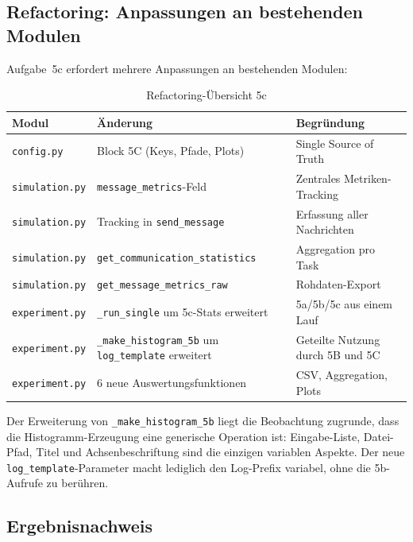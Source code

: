 
\subsection{Refactoring: Anpassungen an bestehenden Modulen}

Aufgabe~5c erfordert mehrere Anpassungen an bestehenden Modulen:

\begin{table}[H]
    \centering
    \scriptsize
    \begin{tabular}{l l l}
        \toprule
        \textbf{Modul} & \textbf{Änderung} & \textbf{Begründung} \\
        \midrule
        \texttt{config.py} & Block 5C (Keys, Pfade, Plots) & Single Source of Truth \\
        \texttt{simulation.py} & \texttt{message\_metrics}-Feld & Zentrales Metriken-Tracking \\
        \texttt{simulation.py} & Tracking in \texttt{send\_message} & Erfassung aller Nachrichten \\
        \texttt{simulation.py} & \texttt{get\_communication\_statistics} & Aggregation pro Task \\
        \texttt{simulation.py} & \texttt{get\_message\_metrics\_raw} & Rohdaten-Export \\
        \texttt{experiment.py} & \texttt{\_run\_single} um 5c-Stats erweitert & 5a/5b/5c aus einem Lauf \\
        \texttt{experiment.py} & \texttt{\_make\_histogram\_5b} um \texttt{log\_template} erweitert & Geteilte Nutzung durch 5B und 5C \\
        \texttt{experiment.py} & 6 neue Auswertungsfunktionen & CSV, Aggregation, Plots \\
        \bottomrule
    \end{tabular}
    \caption{Refactoring-Übersicht 5c}
    \label{tab:refactoring_5c}
\end{table}

Der Erweiterung von \texttt{\_make\_histogram\_5b} liegt die Beobachtung zugrunde, dass die Histogramm-Erzeugung eine generische Operation ist: Eingabe-Liste, Datei-Pfad, Titel und Achsenbeschriftung sind die einzigen variablen Aspekte. Der neue \texttt{log\_template}-Parameter macht lediglich den Log-Prefix variabel, ohne die 5b-Aufrufe zu berühren.


\subsection{Ergebnisnachweis}
\label{sssec:kommunikation_5c_nachweis}

